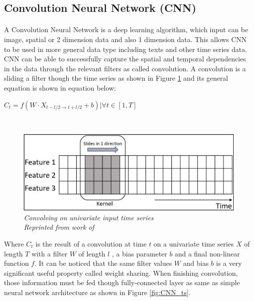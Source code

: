 \subsection{Convolution Neural Network (CNN)}
\paragraph{}
A Convolution Neural Network is a deep learning algorithm, which input can be image, spatial or 2 dimension data and also 1 dimension data. This allows CNN to be used in more general data type including texts and other time series data. CNN can be able to successfully capture the spatial and temporal dependencies in the data through the relevant filters as called convolution. A convolution is a sliding a filter though the time series as shown in Figure \ref{fig:CNN} and its general equation is shown in equation below:

\hfil $C_t = f(W \cdot X_{t-l/2 \to t+l/2} + b) | \forall t \in [1, T] $ \par \

\begin{figure}[H]
  \centering
  \caption[Convolving on univariate input time series]{\emph{Convolving on univariate input time series \\
  Reprinted from work of \citeauthor{ismail_fawaz_forestier_weber_idoumghar_muller_2019} \citeyear{ismail_fawaz_forestier_weber_idoumghar_muller_2019}}}\label{fig:CNN}
  \includegraphics[scale = 0.3]{figures/CNN.jpg}  
\end{figure}


Where $C_t$ is the result of a convolution at time $t$ on a univariate time series $X$ of length $T$ with a filter $W$ of length $l$ , a bias parameter $b$ and a final non-linear function $f$. It can be noticed that the same filter values $W$ and bias $b$ is a very significant useful property called weight sharing. When finishing convolution, those information must be fed though fully-connected layer as same as simple neural network architecture as shown in Figure \ref{fig:CNN_ts}.

